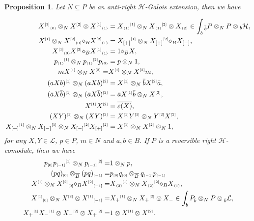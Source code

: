\documentclass[a4paper,reqno]{amsart}
\numberwithin{equation}{section}
\theoremstyle{plain}
\newtheorem{prop}[thm]{Proposition}
\theoremstyle{remark}
\numberwithin{equation}{section}
\newcommand{\ot}{\otimes}
\newcommand{\cL}{\mathcal{L}}
\newcommand{\BB}{\overline{B}}
\newcommand{\yi}[1]{{#1}{}{}^{\scriptscriptstyle{[1]}}}
\newcommand{\er}[1]{{#1}{}{}^{\scriptscriptstyle{[2]}}}
\newcommand{\z}{{}_{\scriptscriptstyle{(0)}}}
\newcommand{\rz}{{}_{\scriptscriptstyle{[0]}}}
\renewcommand{\o}{{}_{\scriptscriptstyle{(1)}}}
\newcommand{\rmo}{{}_{\scriptscriptstyle{[-1]}}}
\renewcommand{\t}{{}_{\scriptscriptstyle{(2)}}}
\newcommand{\di}{{\diamond_{B}}}
\newcommand{\CH}{\mathcal{H}}
\begin{document}
\begin{prop}\label{prop. left Hopf Galois extension}
    Let $N\subseteq P$ be an anti-right $\CH$-Galois extension, then we have

\begin{align}\label{equ. anti translation map 1}
  \yi{X}\z \ot_{N} \er{X} \ot{} \yi{X}\o &= \yi{X\o}\ot_{N}\er{X\o}\ot{}X\t\in\int_{b}{}_{\Bar{b}}P\ot_{N}P\ot {}_{b}\CH,\\
\label{equ. anti translation map 2}
~~ \yi{X}\ot_{N}\er{X}\z\di{}\er{X}\o &= \yi{X_{[+]}}\ot_{N}\er{X_{[+]}}\di{}X_{[-]},\\
\label{equ. anti translation map 3}
\yi{X}\z \er{X}\di{}\yi{X}\o &= 1\di{}X,\\
\label{equ. anti translation map 4}
    \yi{p\o}\ot_{N}\er{p\o}p\z&=p\ot_{N}1,\\
 \label{equ. anti translation map 4.5}
    mX\yi{}\ot_{N}X\er{}=&
    X\yi{}\ot_{N}X\er{}m,\\   
\label{equ. anti translation map 5}
\yi{(aX b )}\ot_{N}\er{(aXb )}
&=\yi{X}\ot_{N}\Bar{b}\er{X}\Bar{a},\\
\label{equ. anti translation map 6}
\yi{(\Bar{a}X  \Bar{b})}\ot_{N}\er{(\Bar{a}X  \Bar{b})}
&=\Bar{a}\yi{X}\Bar{b}\ot_{N}\er{X},\\
\label{equ. anti translation map 6.5}
\yi{X}\er{X}
&=\overline{\varepsilon(X)},\\
\label{equ. anti translation map 7}
\yi{(XY)}\ot_{N}\er{(XY)}&=\yi{X}\yi{Y}\ot_{N}\er{Y}\er{X},\\
\label{equ. anti translation map 7.5}
\yi{X_{[+]}}\ot_{N} \yi{X_{[-]}}\ot_{N} \er{X_{[-]}}\er{X_{[+]}}&=\yi{X}\ot_{N}\er{X}\ot_{N} 1,
\end{align}
for any $X, Y\in \cL$, $p\in P$, $m\in N$ and $a, b\in B$. If $P$ is a  reversible right $\CH$-comodule, then we have
\begin{align}
    \label{equ. regular anti translation map 1}
    p\rz \yi{p\rmo}\ot_{N} \er{p\rmo}=&1\ot_{N}p,\\
    \label{equ. regular map 3}
        (pq)\rz\ot_{\BB}(pq)\rmo=& p\rz q\rz\ot_{\BB} q\rmo p\rmo\\
    \label{equ. regular anti translation map 2}
    \yi{X}\ot_{N}\er{X}\rz\di \er{X}\rmo=&\yi{X\t}\ot_{N}\er{X\t}\di X\o,\\
    \label{equ. regular anti translation map 3}
    \yi{X}\rz\ot_{N}\er{X}\ot{} \yi{X}\rmo=&\yi{X_{+}}\ot_{N}\er{X_{+}}\ot{} X_{-}\in \int_{b}P_{\Bar{b}}\ot_{N}P\ot {}_{\Bar{b}}\cL,\\
    \label{equ. regular anti translation map 4}
    \yi{X_{+}} \yi{X_{-}}\ot \er{X_{-}}\ot \er{X_{+}}=&1\ot\yi{X}\ot \er{X}.
\end{align}
\end{prop}
\end{document}
